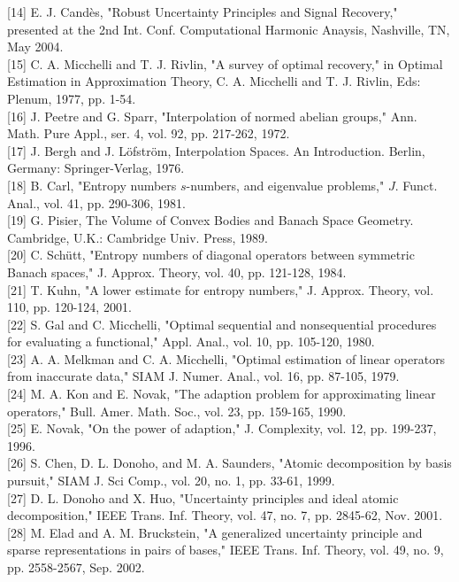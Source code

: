 \documentclass[10pt]{article}
\begin{document}
[14] E. J. Candès, "Robust Uncertainty Principles and Signal Recovery," presented at the 2nd Int. Conf. Computational Harmonic Anaysis, Nashville, TN, May 2004.\\[0pt]
[15] C. A. Micchelli and T. J. Rivlin, "A survey of optimal recovery," in Optimal Estimation in Approximation Theory, C. A. Micchelli and T. J. Rivlin, Eds: Plenum, 1977, pp. 1-54.\\[0pt]
[16] J. Peetre and G. Sparr, "Interpolation of normed abelian groups," Ann. Math. Pure Appl., ser. 4, vol. 92, pp. 217-262, 1972.\\[0pt]
[17] J. Bergh and J. Löfström, Interpolation Spaces. An Introduction. Berlin, Germany: Springer-Verlag, 1976.\\[0pt]
[18] B. Carl, "Entropy numbers $s$-numbers, and eigenvalue problems," $J$. Funct. Anal., vol. 41, pp. 290-306, 1981.\\[0pt]
[19] G. Pisier, The Volume of Convex Bodies and Banach Space Geometry. Cambridge, U.K.: Cambridge Univ. Press, 1989.\\[0pt]
[20] C. Schütt, "Entropy numbers of diagonal operators between symmetric Banach spaces," J. Approx. Theory, vol. 40, pp. 121-128, 1984.\\[0pt]
[21] T. Kuhn, "A lower estimate for entropy numbers," J. Approx. Theory, vol. 110, pp. 120-124, 2001.\\[0pt]
[22] S. Gal and C. Micchelli, "Optimal sequential and nonsequential procedures for evaluating a functional," Appl. Anal., vol. 10, pp. 105-120, 1980.\\[0pt]
[23] A. A. Melkman and C. A. Micchelli, "Optimal estimation of linear operators from inaccurate data," SIAM J. Numer. Anal., vol. 16, pp. 87-105, 1979.\\[0pt]
[24] M. A. Kon and E. Novak, "The adaption problem for approximating linear operators," Bull. Amer. Math. Soc., vol. 23, pp. 159-165, 1990.\\[0pt]
[25] E. Novak, "On the power of adaption," J. Complexity, vol. 12, pp. 199-237, 1996.\\[0pt]
[26] S. Chen, D. L. Donoho, and M. A. Saunders, "Atomic decomposition by basis pursuit," SIAM J. Sci Comp., vol. 20, no. 1, pp. 33-61, 1999.\\[0pt]
[27] D. L. Donoho and X. Huo, "Uncertainty principles and ideal atomic decomposition," IEEE Trans. Inf. Theory, vol. 47, no. 7, pp. 2845-62, Nov. 2001.\\[0pt]
[28] M. Elad and A. M. Bruckstein, "A generalized uncertainty principle and sparse representations in pairs of bases," IEEE Trans. Inf. Theory, vol. 49, no. 9, pp. 2558-2567, Sep. 2002.\\[0pt]
\end{document}
